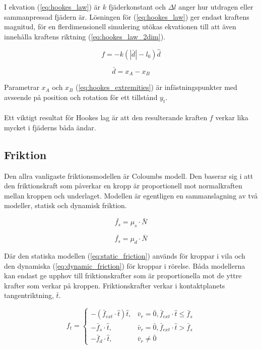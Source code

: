 \documentclass[a4paper,12pt,twopage,swedish]{article}
\begin{document}
I ekvation (\ref{eq:hookes_law}) är $k$  fjäderkonstant och $\Delta l$ anger hur utdragen eller sammanpressad fjädern är. Lösningen för (\ref{eq:hookes_law}) ger endast  kraftens magnitud, för en flerdimensionell simulering utökas ekvationen till att även innehålla kraftens riktning (\ref{eq:hookes_law_2dim}).

\begin{equation}\label{eq:hookes_law_2dim}
f = - k (|\bar{d}| - l_0)\hat{d}
\end{equation}

\begin{equation}\label{eq:hookes_extremities}
\bar{d} = x_A - x_B
\end{equation}

Parametrar $x_A$ och $x_B$ (\ref{eq:hookes_extremities}) är infästningspunkter med avseende på position och rotation för ett tillstånd $y_t$.
\\
\\Ett viktigt resultat för Hookes lag är att den resulterande kraften $f$ verkar lika mycket i fjäderns båda ändar.

\subsection{Friktion}

Den allra vanligaste friktionsmodellen är Coloumbs modell. Den baserar sig i att den friktionskraft som påverkar en kropp är proportionell mot normalkraften mellan kroppen och underlaget. Modellen är egentligen en sammanslagning av två modeller, statisk och dynamisk friktion.

\begin{equation}\label{eq:static_friction}
\bar{f_s} = \mu_s \cdot \bar{N}
\end{equation}

\begin{equation}\label{eq:dynamic_friction}
\bar{f_s} = \mu_d \cdot \bar{N}
\end{equation}

Där den statiska modellen (\ref{eq:static_friction}) används för kroppar i vila och den dynamiska (\ref{eq:dynamic_friction}) för kroppar i rörelse. Båda modellerna kan endast ge upphov till friktionskrafter som är proportionella mot de yttre krafter som verkar på kroppen. Friktionskrafter verkar i kontaktplanets tangentriktning, $\bar{t}$.

\begin{equation}\label{eq:friction_force_final}
f_t =\begin{cases}
    -(\bar{f}_{ext} \cdot \hat{t})\hat{t}, & \bar{v}_r = \bar{0}, \bar{f}_{ext} \cdot \hat{t} \le \bar{f}_s \\
    -\bar{f}_s \cdot \hat{t}, & \bar{v}_r = \bar{0}, \bar{f}_{ext} \cdot \hat{t} > \bar{f}_s \\
    - \bar{f}_d \cdot \hat{t} , & \bar{v}_r \ne \bar{0}
  \end{cases}
\end{equation}
\end{document}
